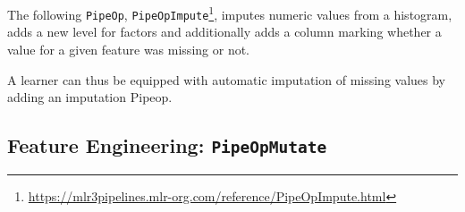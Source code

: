 \documentclass[12pt,]{scrbook}
\newenvironment{Shaded}{}{}
\newcommand{\DataTypeTok}[1]{#1}
\newcommand{\KeywordTok}[1]{\textcolor[rgb]{0.00,0.00,1.00}{#1}}
\newcommand{\NormalTok}[1]{#1}
\newcommand{\OperatorTok}[1]{#1}
\newcommand{\StringTok}[1]{\textcolor[rgb]{0.00,0.50,0.50}{#1}}
\renewcommand{\href}[2]{#2\footnote{\url{#1}}}
\begin{document}
The following \texttt{PipeOp}, \href{https://mlr3pipelines.mlr-org.com/reference/PipeOpImpute.html}{\texttt{PipeOpImpute}}, imputes numeric values from a histogram, adds a new level for factors and additionally adds a column marking whether a value for a given feature was missing or not.

\begin{Shaded}
\end{Shaded}

A learner can thus be equipped with automatic imputation of missing values by adding an imputation Pipeop.

\begin{Shaded}
\end{Shaded}

\hypertarget{feature-engineering-pipeopmutate}{%
\subsection{\texorpdfstring{Feature Engineering: \texttt{PipeOpMutate}}{Feature Engineering: PipeOpMutate}}\label{feature-engineering-pipeopmutate}}
\end{document}
